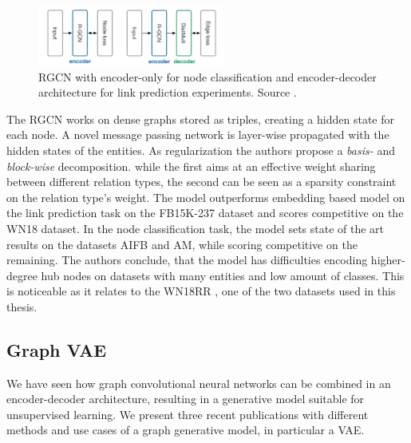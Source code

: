 \begin{figure}[h]
    \centering
    \includegraphics[width=0.55\textwidth]{data/images/RGCN.png}
    \caption{RGCN with encoder-only for node classification and encoder-decoder architecture for link prediction experiments. Source \cite{gangemi_modeling_2018}.}
    \label{fig:RGCN}
\end{figure}

The RGCN works on dense graphs stored as triples, creating a hidden state for each node. A novel message passing network is layer-wise propagated with the hidden states of the entities. As regularization the authors propose a \textit{basis-} and \textit{block-wise} decomposition. while the first  aims at an effective weight sharing between different relation types, the second  can be seen as a sparsity constraint on the relation type's weight. The model outperforms embedding based model on the link prediction task on the FB15K-237 dataset and scores competitive on the WN18 dataset. In the node classification task, the model sets state of the art results on the datasets AIFB and AM, while scoring competitive on the remaining. The authors conclude, that the model has difficulties encoding higher-degree hub nodes on datasets with many entities and low amount of classes. This is noticeable as it relates to the WN18RR \cite{battaglia_relational_2018}, one of the two datasets used in this thesis.  


\subsection{Graph VAE}
We have seen how graph convolutional neural networks can be combined in an encoder-decoder architecture, resulting in a generative model suitable for unsupervised learning. We present three recent publications with different methods and use cases of a graph generative model, in particular a VAE.

